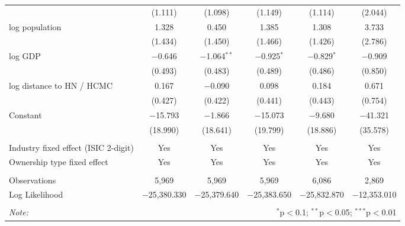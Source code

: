 \begin{sidewaystable}[!htbp]
\begin{tabular}{@{\extracolsep{5pt}}lccccc}
  & (1.111) & (1.098) & (1.149) & (1.114) & (2.044) \\ 
  log population & 1.328 & 0.450 & 1.385 & 1.308 & 3.733 \\ 
  & (1.434) & (1.450) & (1.466) & (1.426) & (2.786) \\ 
  log GDP & $-$0.646 & $-$1.064$^{**}$ & $-$0.925$^{*}$ & $-$0.829$^{*}$ & $-$0.909 \\ 
  & (0.493) & (0.483) & (0.489) & (0.486) & (0.850) \\ 
  log distance to HN / HCMC & 0.167 & $-$0.090 & 0.098 & 0.184 & 0.671 \\ 
  & (0.427) & (0.422) & (0.441) & (0.443) & (0.754) \\ 
  Constant & $-$15.793 & $-$1.866 & $-$15.073 & $-$9.680 & $-$41.321 \\ 
  & (18.990) & (18.641) & (19.799) & (18.886) & (35.578) \\ 
 \hline \\[-1.8ex] 
Industry fixed effect (ISIC 2-digit) & Yes & Yes & Yes & Yes & Yes \\ 
Ownership type fixed effect & Yes & Yes & Yes & Yes & Yes \\ 
\hline \\[-1.8ex] 
Observations & 5,969 & 5,969 & 5,969 & 6,086 & 2,869 \\ 
Log Likelihood & $-$25,380.330 & $-$25,379.640 & $-$25,383.650 & $-$25,832.870 & $-$12,353.010 \\ 
\hline 
\hline \\[-1.8ex] 
\textit{Note:}  & \multicolumn{5}{r}{$^{*}$p$<$0.1; $^{**}$p$<$0.05; $^{***}$p$<$0.01} \\ 
\end{tabular} 
\end{sidewaystable} 
